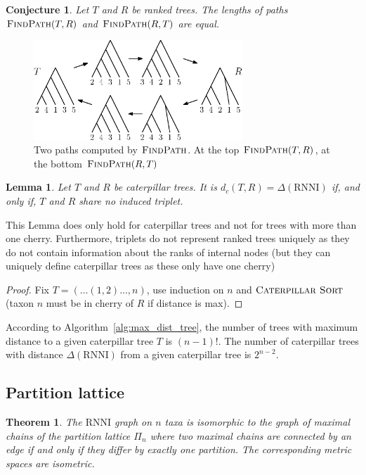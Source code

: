\documentclass{amsart}
\newcommand{\rnni}{\mathrm{RNNI}}
\newcommand{\csort}{\textsc{Caterpillar Sort}}
\newcommand{\findpath}{\textsc{FindPath}}
\newtheorem{theorem}[definition]{Theorem}
\newtheorem{conjecture}[definition]{Conjecture}
\newtheorem{lemma}[definition]{Lemma}
\begin{document}
\begin{conjecture}
    Let $T$ and $R$ be ranked trees.
    The lengths of paths $\findpath(T,R)$ and $\findpath(R,T)$ are equal.
\end{conjecture}

\begin{figure}[H]
	\centering
	\includegraphics[width=0.7\textwidth]{findpath_not_symmetric}
    \vspace{12pt}
	\caption{Two paths computed by $\findpath$. At the top $\findpath(T,R)$, at the bottom $\findpath(R,T)$}
	\label{fig:findpath_not_symmetric}
\end{figure}

\begin{lemma}
    Let $T$ and $R$ be caterpillar trees.
    It is $d_c(T,R) = \Delta(\rnni)$ if, and only if, $T$ and $R$ share no induced triplet.
\end{lemma}

This Lemma does only hold for caterpillar trees and not for trees with more than one cherry.
Furthermore, triplets do not represent ranked trees uniquely as they do not contain information about the ranks of internal nodes (but they can uniquely define caterpillar trees as these only have one cherry)

\begin{proof}
    Fix $T = (\ldots(1,2) \ldots ,n)$, use induction on $n$ and $\csort$ (taxon $n$ must be in cherry of $R$ if distance is max).
\end{proof}

According to Algorithm~\ref{alg:max_dist_tree}, the number of trees with maximum distance to a given caterpillar tree $T$ is $(n-1)!$.
The number of caterpillar trees with distance $\Delta(\rnni)$ from a given caterpillar tree is $2^{n-2}$.


\subsection{Partition lattice}


\begin{theorem}
The $\rnni$ graph on $n$ taxa is isomorphic to the graph of maximal chains of the partition lattice $\Pi_n$ where two maximal chains are connected by an edge if and only if they differ by exactly one partition.
The corresponding metric spaces are isometric.
\end{theorem}


\printbibliography
\end{document}
